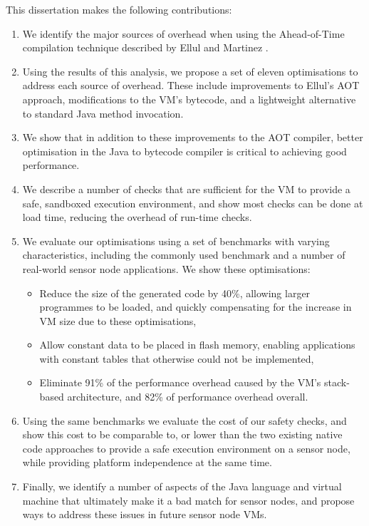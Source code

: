 \noindent
This dissertation makes the following contributions:
\begin{enumerate}
    \item We identify the major sources of overhead when using the Ahead-of-Time compilation technique described by Ellul and Martinez \cite{Ellul:2010iw, Ellul:2012thesis}.
    \item Using the results of this analysis, we propose a set of eleven optimisations to address each source of overhead. These include improvements to Ellul's AOT approach, modifications to the VM's bytecode, and a lightweight alternative to standard Java method invocation.    
    \item We show that in addition to these improvements to the AOT compiler, better optimisation in the Java to bytecode compiler is critical to achieving good performance.
    \item We describe a number of checks that are sufficient for the VM to provide a safe, sandboxed execution environment, and show most checks can be done at load time, reducing the overhead of run-time checks.
    \item We evaluate our optimisations using a set of benchmarks with varying characteristics, including the commonly used  benchmark \cite{coremark} and a number of real-world sensor node applications. We show these optimisations:
    \begin{itemize}
    	\item Reduce the size of the generated code by 40\%, allowing larger programmes to be loaded, and quickly compensating for the increase in VM size due to these optimisations,
    	\item Allow constant data to be placed in flash memory, enabling applications with constant tables that otherwise could not be implemented,
    	\item Eliminate 91\% of the performance overhead caused by the VM's stack-based architecture, and 82\% of performance overhead overall.
    \end{itemize}
    \item Using the same benchmarks we evaluate the cost of our safety checks, and show this cost to be comparable to, or lower than the two existing native code approaches to provide a safe execution environment on a sensor node, while providing platform independence at the same time.
    \item Finally, we identify a number of aspects of the Java language and virtual machine that ultimately make it a bad match for sensor nodes, and propose ways to address these issues in future sensor node VMs.
\end{enumerate}

